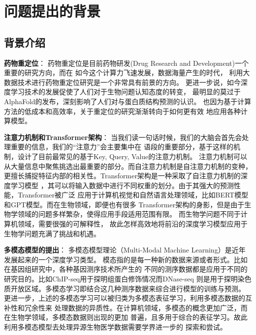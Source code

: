 \section{问题提出的背景}


\subsection{背景介绍}

\par \textbf{药物重定位}：
药物重定位是目前药物研发(Drug Research and Development)一个重要的研究方向，而在
如今这个计算力飞速发展，数据海量产生的时代，
利用大数据技术进行药物重定位研究是一个非常具有前景的方向。
更进一步说，如今深度学习技术的发展促使了人们对于生物问题认知态度的转变，
最明显的莫过于AlphaFold的发布，深刻影响了人们对与蛋白质结构预测的认识。
也因为基于计算方法的低成本和高效率，关于重定位的研究渐渐转向于如何更有效
地应用各种计算模型。

\par \textbf{注意力机制和Transformer架构}：
当我们读一句话时候，我们的大脑会首先会处理重要的信息，我们的“注意力”会主要集中在
语段的重要部分，基于这样的机制，设计了目前最常见的基于Key, Query, Value的注意力机制。
注意力机制可以从大量信息中聚焦挑选出最重要的部分。而自注意力机制是自注意力机制的变种，
更擅长捕捉特征内部的相关性。Transformer架构是一种采取了自注意力机制的深度学习模型
，其可以将输入数据中进行不同权重的划分。由于其强大的预测性能，Transformer被广泛
应用于计算机视觉和自然语言处理领域，比如BERT模型和GPT模型。而在生物领域，即便也有很多
Transformer架构的身影，但是由于生物学领域的问题多样繁杂，使得应用手段适用范围有限。
而生物学问题不同于计算机领域，需要很强的可解释性，
故此怎样高效地将前沿的深度学习模型应用于生物学问题充满了挑战和机遇。

\par \textbf{多模态模型的提出}：
多模态模型理论（Multi-Modal Machine Learning）是近年发展起来的一个深度学习类型。
模态指的是每一种新的数据来源或者形式。比如在基因组研究中，各种基因测序技术所产生的
不同的测序数据都是应用于不同的研究目的。比如ChIP-seq用于探明组蛋白修饰情况而DNase-seq
则是用于探明染色质开放区域。多模态学习即结合这几种测序数据来综合进行模型的训练与预测。
更进一步，上述的多模态学习可以被归类为多模态表征学习，利用多模态数据的互补性和冗余性来
处理数据的异质性。在计算机领域，多模态的概念更加广泛，而在生物学领域，多模态数据则出现的更加
普遍，且多用于综合的表征学习。故此利用多模态模型去处理异源生物医学数据需要学界进一步的
探索和尝试。


